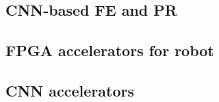 \label{sec:relate}
\subsection{ CNN-based FE and PR }

\subsection{ FPGA accelerators for robot }

\subsection{ CNN accelerators }